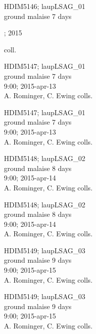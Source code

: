 \documentclass[6pt]{article}
\begin{document}
\noindent
\parbox{0.135\textwidth}{\tiny HDIM5146; laupLSAG\_01\\ ground malaise  7 days\\ \rule{0ex}{0ex}\hspace{4.5em}; 2015\\ \rule{0ex}{0ex}\hspace{6em} coll.}
\parbox{0.135\textwidth}{\tiny HDIM5147; laupLSAG\_01\\ ground malaise  7 days\\ 9:00; 2015-apr-13\\ A. Rominger, C. Ewing colls.}
\parbox{0.135\textwidth}{\tiny HDIM5147; laupLSAG\_01\\ ground malaise  7 days\\ 9:00; 2015-apr-13\\ A. Rominger, C. Ewing colls.}
\parbox{0.135\textwidth}{\tiny HDIM5148; laupLSAG\_02\\ ground malaise  8 days\\ 9:00; 2015-apr-14\\ A. Rominger, C. Ewing colls.}
\parbox{0.135\textwidth}{\tiny HDIM5148; laupLSAG\_02\\ ground malaise  8 days\\ 9:00; 2015-apr-14\\ A. Rominger, C. Ewing colls.}
\parbox{0.135\textwidth}{\tiny HDIM5149; laupLSAG\_03\\ ground malaise  9 days\\ 9:00; 2015-apr-15\\ A. Rominger, C. Ewing colls.}
\parbox{0.135\textwidth}{\tiny HDIM5149; laupLSAG\_03\\ ground malaise  9 days\\ 9:00; 2015-apr-15\\ A. Rominger, C. Ewing colls.} \\ 
\vspace{0.001in} 
\end{document}
